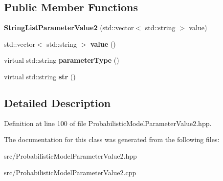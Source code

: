 \subsection*{Public Member Functions}
\begin{DoxyCompactItemize}
\item 
\mbox{\label{classtops_1_1StringListParameterValue2_a8d5c1e769a4a701da758f2cfedf3fc4a}} 
{\bfseries String\+List\+Parameter\+Value2} (std\+::vector$<$ std\+::string $>$ value)
\item 
\mbox{\label{classtops_1_1StringListParameterValue2_ade03ee1e49ef98f8dc24eada9be52a99}} 
std\+::vector$<$ std\+::string $>$ {\bfseries value} ()
\item 
\mbox{\label{classtops_1_1StringListParameterValue2_a93f364c3c444b3e0dd140c3191b9a5e2}} 
virtual std\+::string {\bfseries parameter\+Type} ()
\item 
\mbox{\label{classtops_1_1StringListParameterValue2_ac6019b32af690872bf83e8d8694fb850}} 
virtual std\+::string {\bfseries str} ()
\end{DoxyCompactItemize}


\subsection{Detailed Description}


Definition at line 100 of file Probabilistic\+Model\+Parameter\+Value2.\+hpp.



The documentation for this class was generated from the following files\+:\begin{DoxyCompactItemize}
\item 
src/Probabilistic\+Model\+Parameter\+Value2.\+hpp\item 
src/Probabilistic\+Model\+Parameter\+Value2.\+cpp\end{DoxyCompactItemize}
